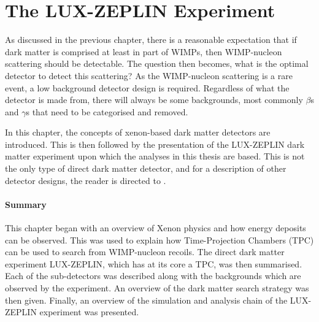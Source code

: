 \chapter{The LUX-ZEPLIN Experiment}
\label{sec:lz_detector_chapter}
\par
As discussed in the previous chapter, there is a reasonable expectation that if dark matter is comprised at least in part of WIMPs, then WIMP-nucleon scattering should be detectable.
The question then becomes, what is the optimal detector to detect this scattering?
As the WIMP-nucleon scattering is a rare event, a low background detector design is required.
Regardless of what the detector is made from, there will always be some backgrounds, most commonly $\beta$s and $\gamma$s that need to be categorised and removed.
\par
In this chapter, the concepts of xenon-based dark matter detectors are introduced.
This is then followed by the presentation of the LUX-ZEPLIN dark matter experiment upon which the analyses in this thesis are based.
This is not the only type of direct dark matter detector, and for a description of other detector designs, the reader is directed to \cite{direct_detector_designs_ref}.



\clearpage


%

\subsubsection*{Summary}
\par
This chapter began with an overview of Xenon physics and how energy deposits can be observed.
This was used to explain how Time-Projection Chambers (TPC) can be used to search from WIMP-nucleon recoils.
The direct dark matter experiment LUX-ZEPLIN, which has at its core a TPC, was then summarised.
Each of the sub-detectors was described along with the backgrounds which are observed by the experiment.
An overview of the dark matter search strategy was then given.
Finally, an overview of the simulation and analysis chain of the LUX-ZEPLIN experiment was presented.
